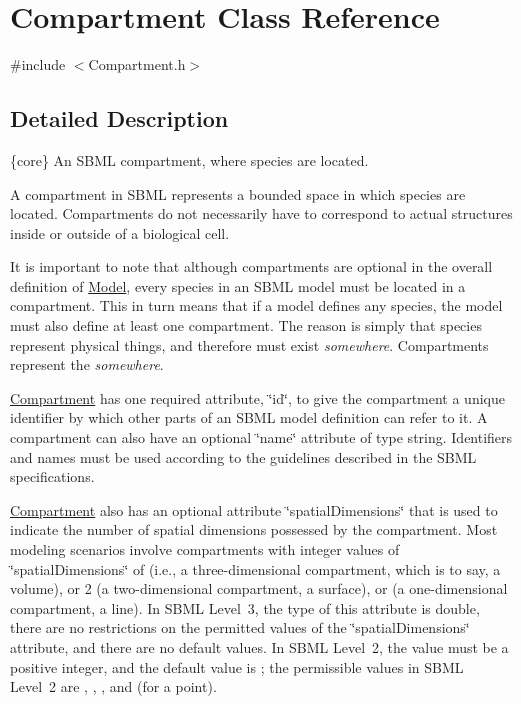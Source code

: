 \hypertarget{class_compartment}{}\section{Compartment Class Reference}
\label{class_compartment}


{\ttfamily \#include $<$Compartment.\+h$>$}



\subsection{Detailed Description}
\{core\} An S\+B\+ML compartment, where species are located.

A compartment in S\+B\+ML represents a bounded space in which species are located. Compartments do not necessarily have to correspond to actual structures inside or outside of a biological cell.

It is important to note that although compartments are optional in the overall definition of \hyperlink{class_model}{Model}, every species in an S\+B\+ML model must be located in a compartment. This in turn means that if a model defines any species, the model must also define at least one compartment. The reason is simply that species represent physical things, and therefore must exist {\itshape somewhere}. Compartments represent the {\itshape somewhere}.

\hyperlink{class_compartment}{Compartment} has one required attribute, \char`\"{}id\char`\"{}, to give the compartment a unique identifier by which other parts of an S\+B\+ML model definition can refer to it. A compartment can also have an optional \char`\"{}name\char`\"{} attribute of type {\ttfamily string}. Identifiers and names must be used according to the guidelines described in the S\+B\+ML specifications.

\hyperlink{class_compartment}{Compartment} also has an optional attribute \char`\"{}spatial\+Dimensions\char`\"{} that is used to indicate the number of spatial dimensions possessed by the compartment. Most modeling scenarios involve compartments with integer values of \char`\"{}spatial\+Dimensions\char`\"{} of {} (i.\+e., a three-\/dimensional compartment, which is to say, a volume), or 2 (a two-\/dimensional compartment, a surface), or {} (a one-\/dimensional compartment, a line). In S\+B\+ML Level~3, the type of this attribute is {\ttfamily double}, there are no restrictions on the permitted values of the \char`\"{}spatial\+Dimensions\char`\"{} attribute, and there are no default values. In S\+B\+ML Level~2, the value must be a positive {\ttfamily integer}, and the default value is {}; the permissible values in S\+B\+ML Level~2 are {}, {}, {}, and {} (for a point).

